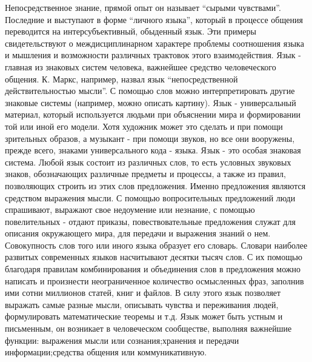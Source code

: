 \documentclass[12pt]{article}
\begin{document}
Непосредственное знание, прямой опыт он называет “сырыми чувствами”. Последние и выступают в форме
“личного  языка”,  который  в  процессе  общения  переводится  на  интерсубъективный,  обыденный  язык.  Эти
примеры  свидетельствуют  о  междисциплинарном  характере  проблемы  соотношения  языка  и  мышления  и
возможности различных трактовок этого взаимодействия.
Язык - главная из знаковых систем человека, важнейшее средство человеческого общения. К. Маркс, например,
назвал язык “непосредственной действительностью мысли”. С помощью слов можно интерпретировать другие
знаковые системы (например, можно описать картину). Язык - универсальный материал, который используется
людьми при объяснении мира и формировании той или иной его модели. Хотя художник может это сделать и
при помощи зрительных образов, а музыкант - при помощи звуков, но все они вооружены, прежде всего,
знаками универсального кода - языка. 
Язык - это особая знаковая система. Любой язык состоит из различных слов, то есть условных звуковых знаков,
обозначающих  различные  предметы  и  процессы,  а  также  из  правил,  позволяющих  строить  из  этих  слов
предложения.  Именно  предложения  являются  средством  выражения  мысли.  С  помощью  вопросительных
предложений люди спрашивают, выражают свое недоумение или незнание, с помощью повелительных - отдают
приказы, повествовательные предложения служат для описания окружающего мира, для передачи и выражения
знаний о нем. Совокупность слов того или иного языка образует его словарь. Словари наиболее развитых
современных языков насчитывают десятки тысяч слов. С их помощью благодаря правилам комбинирования и
объединения слов в предложения можно написать и произнести  неограниченное количество осмысленных
фраз, заполнив ими сотни миллионов статей, книг и файлов. В силу этого язык позволяет выражать самые
разные мысли, описывать чувства и переживания людей, формулировать математические теоремы и т.д.
Язык может быть устным и письменным, он возникает в человеческом сообществе, выполняя  важнейшие
функции:  выражения  мысли  или  сознания;хранения  и  передачи  информации;средства  общения  или
коммуникативную.


\newpage
\end{document}
